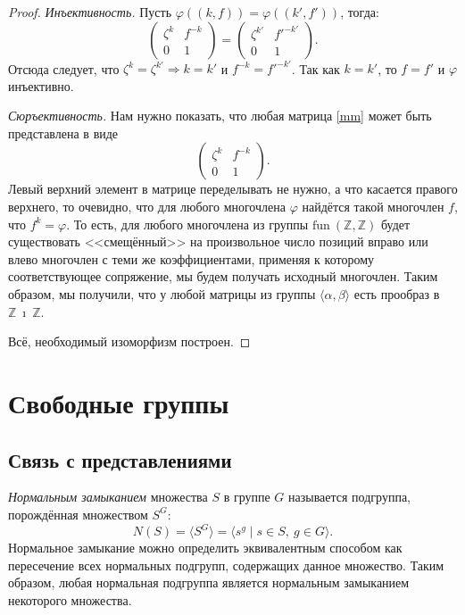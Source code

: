 \documentclass{article}
\begin{document}
\begin{proof}
     \textit{Инъективность.} Пусть $\varphi((k, f)) = \varphi((k',f'))$, тогда:
     \[
        \begin{pmatrix}
            \zeta^k & f^{-k} \\
            0 & 1
        \end{pmatrix} =
        \begin{pmatrix}
            \zeta^{k'} & f'^{-k'} \\
            0 & 1
        \end{pmatrix}.
     \]
     Отсюда следует, что $\zeta^k = \zeta^{k'} \Rightarrow k = k'$ и $f^{-k} = f'^{-k'}$. Так как $k = k'$, то $f = f'$ и $\varphi$ инъективно.

     \textit{Сюръективность.} Нам нужно показать, что любая матрица \eqref{mm} может быть представлена в виде
     \[
        \begin{pmatrix}
            \zeta^k & f^{-k} \\
            0 & 1
        \end{pmatrix}.
     \]
    Левый верхний элемент в матрице переделывать не нужно, а что касается правого верхнего, то очевидно, что для любого многочлена $\varphi$ найдётся такой многочлен $f$, что $f^k = \varphi$. То есть, для любого многочлена из группы $\mathrm{fun} \ (\mathbb{Z}, \mathbb{Z})$ будет существовать <<смещённый>> на произвольное число позиций вправо или влево многочлен с теми же коэффициентами, применяя к которому соответствующее сопряжение, мы будем получать исходный многочлен.
    Таким образом, мы получили, что у любой матрицы из группы $\langle \alpha, \beta \rangle$ есть прообраз в $\mathbb{Z} \ \imath \ \mathbb{Z}$.

    Всё, необходимый изоморфизм построен.
\end{proof}

\newpage

\section{Свободные группы}

\subsection{Связь с представлениями}

\textit{Нормальным замыканием} множества $S$ в группе $G$ называется подгруппа, порождённая множеством $S^G$:
\[
    N(S) = \langle S^G \rangle = \langle s^g \mid s \in S, \ g \in G \rangle.
\]
Нормальное замыкание можно определить эквивалентным способом как пересечение всех нормальных подгрупп, содержащих данное множество. Таким образом, любая нормальная подгруппа является нормальным замыканием некоторого множества.
\end{document}
